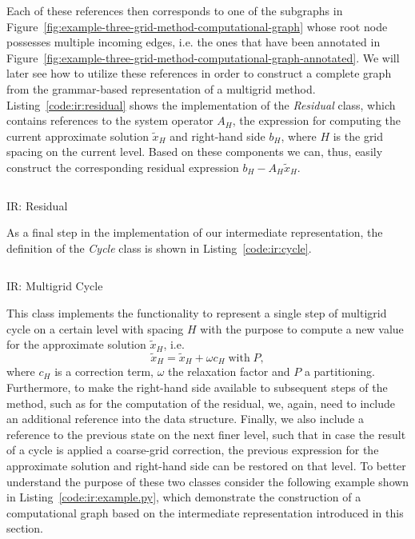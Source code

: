 Each of these references then corresponds to one of the subgraphs in Figure~\ref{fig:example-three-grid-method-computational-graph} whose root node possesses multiple incoming edges, i.e. the ones that have been annotated in Figure~\ref{fig:example-three-grid-method-computational-graph-annotated}.
We will later see how to utilize these references in order to construct a complete graph from the grammar-based representation of a multigrid method.
Listing~\ref{code:ir:residual} shows the implementation of the \emph{Residual} class, which contains references to the system operator $A_H$, the expression for computing the current approximate solution $\tilde{x}_H$ and right-hand side $b_H$, where $H$ is the grid spacing on the current level.
Based on these components we can, thus, easily construct the corresponding residual expression $b_H - A_H \tilde{x}_H$.
\begin{listing}
	\inputminted{python}{evostencils/ir/residual.py}
	\caption{IR: Residual}
	\label{code:ir:residual}
\end{listing}
As a final step in the implementation of our intermediate representation, the definition of the \emph{Cycle} class is shown in Listing~\ref{code:ir:cycle}.
\begin{listing}
	\inputminted{python}{evostencils/ir/cycle.py}
	\caption{IR: Multigrid Cycle}
	\label{code:ir:cycle}
\end{listing}
This class implements the functionality to represent a single step of multigrid cycle on a certain level with spacing $H$ with the purpose to compute a new value for the approximate solution $\tilde{x}_H$, i.e.
\begin{equation}
	\tilde{x}_H = \tilde{x}_H + \omega c_H \; \text{with} \; P,
\end{equation}
where $c_H$ is a correction term, $\omega$ the relaxation factor and $P$ a partitioning.
Furthermore, to make the right-hand side available to subsequent steps of the method, such as for the computation of the residual, we, again, need to include an additional reference into the data structure.
Finally, we also include a reference to the previous state on the next finer level, such that in case the result of a cycle is applied a coarse-grid correction, the previous expression for the approximate solution and right-hand side can be restored on that level.
To better understand the purpose of these two classes consider the following example shown in Listing~\ref{code:ir:example.py}, which demonstrate the construction of a computational graph based on the intermediate representation introduced in this section.
